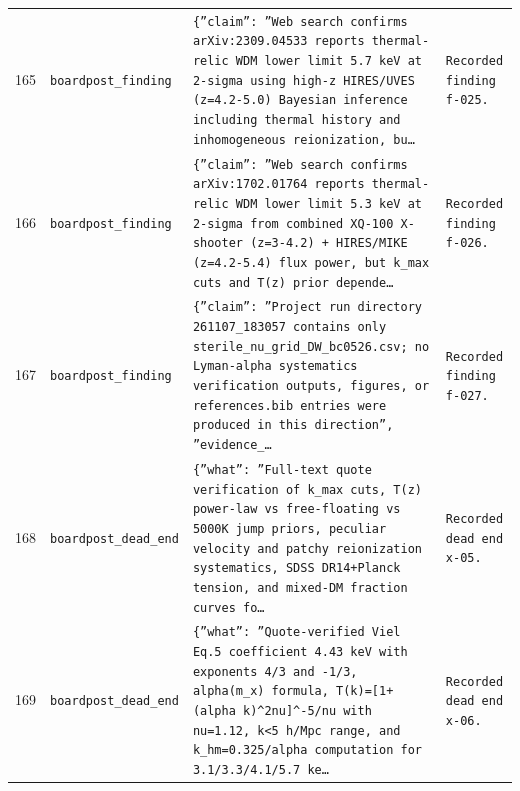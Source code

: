 \documentclass[11pt,a4paper]{article}
\begin{document}
\begin{longtable}{@{}p{}p{}p{}p{}@{}}
165 & \texttt{board}\newline\texttt{post\_\allowbreak{}finding} & \texttt{\{''claim'':\allowbreak{} ''Web search confirms arXiv:\allowbreak{}2309.04533 reports thermal-relic WDM lower limit 5.7 keV at 2-sigma using high-z HIRES/\allowbreak{}UVES (z=\allowbreak{}4.2-5.0)\allowbreak{} Bayesian inference including thermal history and inhomogeneous reionization,\allowbreak{} bu\ldots{}\allowbreak{}} & \texttt{Recorded finding f-025.} \\
166 & \texttt{board}\newline\texttt{post\_\allowbreak{}finding} & \texttt{\{''claim'':\allowbreak{} ''Web search confirms arXiv:\allowbreak{}1702.01764 reports thermal-relic WDM lower limit 5.3 keV at 2-sigma from combined XQ-100 X-shooter (z=\allowbreak{}3-4.2)\allowbreak{} + HIRES/\allowbreak{}MIKE (z=\allowbreak{}4.2-5.4)\allowbreak{} flux power,\allowbreak{} but k\_\allowbreak{}max cuts and T(z)\allowbreak{} prior depende\ldots{}\allowbreak{}} & \texttt{Recorded finding f-026.} \\
167 & \texttt{board}\newline\texttt{post\_\allowbreak{}finding} & \texttt{\{''claim'':\allowbreak{} ''Project run directory 261107\_\allowbreak{}183057 contains only sterile\_\allowbreak{}nu\_\allowbreak{}grid\_\allowbreak{}DW\_\allowbreak{}bc0526.csv;\allowbreak{} no Lyman-alpha systematics verification outputs,\allowbreak{} figures,\allowbreak{} or references.bib entries were produced in this direction'',\allowbreak{} ''evidence\_\allowbreak{}\ldots{}\allowbreak{}} & \texttt{Recorded finding f-027.} \\
168 & \texttt{board}\newline\texttt{post\_\allowbreak{}dead\_\allowbreak{}end} & \texttt{\{''what'':\allowbreak{} ''Full-text quote verification of k\_\allowbreak{}max cuts,\allowbreak{} T(z)\allowbreak{} power-law vs free-floating vs 5000K jump priors,\allowbreak{} peculiar velocity and patchy reionization systematics,\allowbreak{} SDSS DR14+Planck tension,\allowbreak{} and mixed-DM fraction curves fo\ldots{}\allowbreak{}} & \texttt{Recorded dead end x-05.} \\
169 & \texttt{board}\newline\texttt{post\_\allowbreak{}dead\_\allowbreak{}end} & \texttt{\{''what'':\allowbreak{} ''Quote-verified Viel Eq.5 coefficient 4.43 keV with exponents 4/\allowbreak{}3 and -1/\allowbreak{}3,\allowbreak{} alpha(m\_\allowbreak{}x)\allowbreak{} formula,\allowbreak{} T(k)\allowbreak{}=\allowbreak{}[1+(alpha k)\allowbreak{}\textasciicircum{}\allowbreak{}2nu]\allowbreak{}\textasciicircum{}\allowbreak{}-5/\allowbreak{}nu with nu=\allowbreak{}1.12,\allowbreak{} k\textless{}\allowbreak{}5 h/\allowbreak{}Mpc range,\allowbreak{} and k\_\allowbreak{}hm=\allowbreak{}0.325/\allowbreak{}alpha computation for 3.1/\allowbreak{}3.3/\allowbreak{}4.1/\allowbreak{}5.7 ke\ldots{}\allowbreak{}} & \texttt{Recorded dead end x-06.} \\

\end{longtable}
\end{document}
